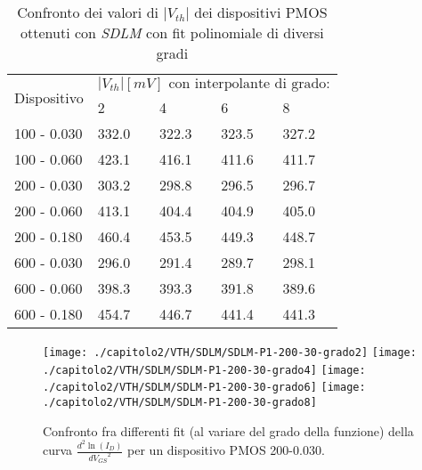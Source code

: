 \begin{table}[h]
  \renewcommand{\arraystretch}{1.3}
  \centering
  \begin{tabular}{m{2.1cm} m{2cm} m{2cm} m{2cm} m{2cm}}
    \toprule
    \multirow{2}{*}{Dispositivo} & \multicolumn{4}{c}{$|V_{th}| [mV] \text{ con interpolante di grado:}$}                         \\
    \cmidrule{2-5}
                                 & 2                                                                    & 4     & 6     & 8     \\
    \midrule
    100 - 0.030                  & 332.0                                                                & 322.3 & 323.5 & 327.2 \\
    \hline
    100 - 0.060                  & 423.1                                                                & 416.1 & 411.6 & 411.7 \\
    \hline
    200 - 0.030                  & 303.2                                                                & 298.8 & 296.5 & 296.7 \\
    \hline
    200 - 0.060                  & 413.1                                                                & 404.4 & 404.9 & 405.0 \\
    \hline
    200 - 0.180                  & 460.4                                                                & 453.5 & 449.3 & 448.7 \\
    \hline
    600 - 0.030                  & 296.0                                                                & 291.4 & 289.7 & 298.1 \\
    \hline
    600 - 0.060                  & 398.3                                                                & 393.3 & 391.8 & 389.6 \\
    \hline
    600 - 0.180                  & 454.7                                                                & 446.7 & 441.4 & 441.3 \\
    \hline
  \end{tabular}
  \caption[Confronto $|V_{th}|$ al variare del grado del fit polinomiale con il metodo SDLM]{Confronto dei valori di $|V_{th}|$ dei dispositivi PMOS ottenuti con \emph{SDLM} con fit polinomiale di diversi gradi}
  \label{tab:GradiSDLM}
\end{table}

\begin{figure}[h!]
  \centering
  \texttt{[image: ./capitolo2/VTH/SDLM/SDLM-P1-200-30-grado2]}
  \texttt{[image: ./capitolo2/VTH/SDLM/SDLM-P1-200-30-grado4]}
  \texttt{[image: ./capitolo2/VTH/SDLM/SDLM-P1-200-30-grado6]}
  \texttt{[image: ./capitolo2/VTH/SDLM/SDLM-P1-200-30-grado8]}
  \caption[Confronto SDLM tra diversi fit polinomiali a diversi gradi]{Confronto fra differenti fit (al variare del grado della funzione) della curva $\frac{d^2 \ln(I_D)}{d {V_{GS}}^2}$ per un dispositivo PMOS 200-0.030.}
  \label{fig:GradiSDLM}
\end{figure}

